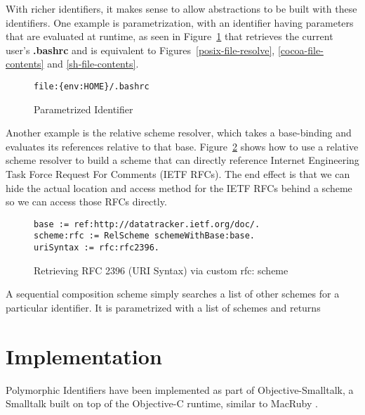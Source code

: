 \documentclass[preprint,authoryear]{acm_proc_article-sp}
\begin{document}
With richer identifiers, it makes sense to allow abstractions to be built with these identifiers.
One example is parametrization, with an identifier having parameters that are evaluated
at runtime, as seen in Figure~\ref{bashrc-pi} that retrieves the current user's {\bf .bashrc} 
and is equivalent to Figures~\ref{posix-file-resolve}, \ref{cocoa-file-contents} and 
\ref{sh-file-contents}.

\begin{figure}[htbp]
\begin{center}
\begin{verbatim}
file:{env:HOME}/.bashrc
\end{verbatim}
\caption{Parametrized Identifier}
\label{bashrc-pi}
\end{center}
\end{figure}

Another example is the relative scheme resolver, which takes a base-binding
and evaluates its references relative to that base.  Figure~\ref{rfc-scheme} shows
how to use a relative scheme resolver to build a scheme that can directly
reference Internet Engineering Task Force Request For Comments (IETF RFCs).
The end effect is that we can hide the actual location and access method for
the IETF RFCs behind a scheme so we can access those RFCs directly.

\begin{figure}[htbp]
\begin{center}
\begin{verbatim}
base := ref:http://datatracker.ietf.org/doc/.
scheme:rfc := RelScheme schemeWithBase:base.
uriSyntax := rfc:rfc2396.
\end{verbatim}
\caption{Retrieving RFC 2396 (URI Syntax) via custom rfc: scheme}
\label{rfc-scheme}
\end{center}
\end{figure}

A sequential composition scheme simply searches a list of other schemes
for a particular identifier.  It is parametrized with a list of schemes and 
returns 


\section{Implementation}

Polymorphic Identifiers have been implemented as part of Objective-Smalltalk,
a Smalltalk built on top of the Objective-C runtime, similar to MacRuby \cite{macruby}. 
\end{document}
